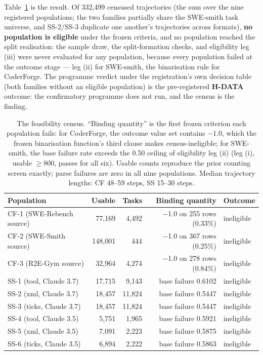 \documentclass[11pt]{article}
\begin{document}
Table~\ref{tab:census} is the result. Of 332{,}499 censused
trajectories (the sum over the nine registered populations;
the two families partially share the SWE-smith task universe,
and SS-2/SS-3 duplicate one another's trajectories across
formats), \textbf{no population is eligible} under the frozen
criteria, and no population reached the split realisation: the
sample draw, the split-formation checks, and eligibility leg
(iii) were never evaluated for any population, because every
population failed at the outcome stage --- leg (ii) for
SWE-smith, the binarisation rule for CoderForge. The programme
verdict under the registration's own decision table (both
families without an eligible population) is the pre-registered
\textbf{H-DATA} outcome: the confirmatory programme does not
run, and the census is the finding.

\begin{table}[t]
\centering\small
\begin{tabular}{lrrrl}
\toprule
Population & Usable & Tasks & Binding quantity & Outcome\\
\midrule
CF-1 (SWE-Rebench source) & 77{,}169 & 4{,}492 & $-$1.0 on 255 rows (0.33\%) & ineligible\\
CF-2 (SWE-Smith source) & 148{,}001 & 444 & $-$1.0 on 367 rows (0.25\%) & ineligible\\
CF-3 (R2E-Gym source) & 32{,}964 & 4{,}274 & $-$1.0 on 278 rows (0.84\%) & ineligible\\
SS-1 (tool, Claude 3.7) & 17{,}715 & 9{,}143 & base failure 0.6102 & ineligible\\
SS-2 (xml, Claude 3.7) & 18{,}457 & 11{,}824 & base failure 0.5447 & ineligible\\
SS-3 (ticks, Claude 3.7) & 18{,}457 & 11{,}824 & base failure 0.5447 & ineligible\\
SS-4 (tool, Claude 3.5) & 5{,}751 & 1{,}965 & base failure 0.5921 & ineligible\\
SS-5 (xml, Claude 3.5) & 7{,}091 & 2{,}223 & base failure 0.5875 & ineligible\\
SS-6 (ticks, Claude 3.5) & 6{,}894 & 2{,}222 & base failure 0.5863 & ineligible\\
\bottomrule
\end{tabular}
\caption{The feasibility census. ``Binding quantity'' is the
first frozen criterion each population fails: for CoderForge,
the outcome value set contains $-1.0$, which the frozen
binarisation function's third clause makes census-ineligible;
for SWE-smith, the base failure rate exceeds the 0.50 ceiling
of eligibility leg (ii) (leg (i), usable $\ge 800$, passes for
all six). Usable counts reproduce the prior counting screen
exactly; parse failures are zero in all nine populations.
Median trajectory lengths: CF 48--59 steps, SS 15--30 steps.}
\label{tab:census}
\end{table}
\end{document}
